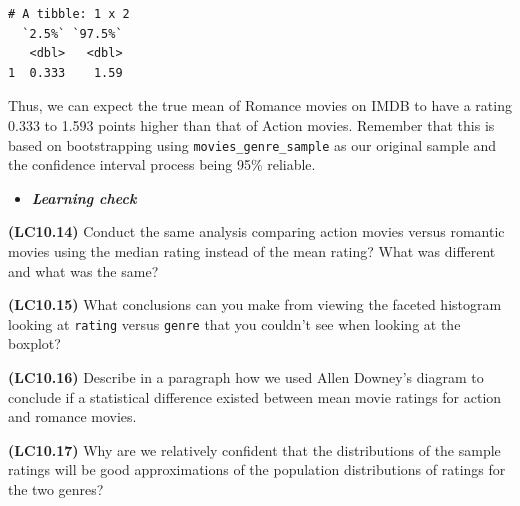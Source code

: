 \documentclass[12pt,]{krantz}
\makeatletter
\newenvironment{Shaded}{\begin{snugshade}}{\end{snugshade}}
\newcommand{\KeywordTok}[1]{\textcolor[rgb]{0.27,0.27,0.27}{\textbf{#1}}}
\newcommand{\DataTypeTok}[1]{\textcolor[rgb]{0.27,0.27,0.27}{#1}}
\newcommand{\DecValTok}[1]{\textcolor[rgb]{0.06,0.06,0.06}{#1}}
\newcommand{\StringTok}[1]{\textcolor[rgb]{0.5,0.5,0.5}{#1}}
\newcommand{\CommentTok}[1]{\textcolor[rgb]{0.37,0.37,0.37}{\textit{#1}}}
\newcommand{\OperatorTok}[1]{\textcolor[rgb]{0.43,0.43,0.43}{\textbf{#1}}}
\newcommand{\NormalTok}[1]{#1}
\newenvironment{kframe}{%
\medskip{}
\setlength{\fboxsep}{.8em}
 \def\at@end@of@kframe{}%
 \ifinner\ifhmode%
  \def\at@end@of@kframe{\end{minipage}}%
  \begin{minipage}{\columnwidth}%
 \fi\fi%
 \def\FrameCommand##1{\hskip\@totalleftmargin \hskip-\fboxsep
 \colorbox{shadecolor}{##1}\hskip-\fboxsep
     \hskip-\linewidth \hskip-\@totalleftmargin \hskip\columnwidth}%
 \MakeFramed {\advance\hsize-\width
   \@totalleftmargin\z@ \linewidth\hsize
   \@setminipage}}%
 {\par\unskip\endMakeFramed%
 \at@end@of@kframe}
\renewenvironment{Shaded}{\begin{kframe}}{\end{kframe}}
\newenvironment{rmdblock}[1]
  {\begin{shaded*}
  \begin{itemize}
  \renewcommand{\labelitemi}{
    \raisebox{-.7\height}[0pt][0pt]{
    }
  }
  \item
  }
  {
  \end{itemize}
  \end{shaded*}
  }
\newenvironment{learncheck}
  {\begin{rmdblock}{warning}}
  {\end{rmdblock}}
\makeatother
\begin{document}
\begin{Shaded}
\end{Shaded}

\begin{verbatim}
# A tibble: 1 x 2
  `2.5%` `97.5%`
   <dbl>   <dbl>
1  0.333    1.59
\end{verbatim}

Thus, we can expect the true mean of Romance movies on IMDB to have a
rating 0.333 to 1.593 points higher than that of Action movies. Remember
that this is based on bootstrapping using \texttt{movies\_genre\_sample}
as our original sample and the confidence interval process being 95\%
reliable.

\begin{learncheck}
\textbf{\emph{Learning check}}
\end{learncheck}

\textbf{(LC10.14)} Conduct the same analysis comparing action movies
versus romantic movies using the median rating instead of the mean
rating? What was different and what was the same?

\textbf{(LC10.15)} What conclusions can you make from viewing the
faceted histogram looking at \texttt{rating} versus \texttt{genre} that
you couldn't see when looking at the boxplot?

\textbf{(LC10.16)} Describe in a paragraph how we used Allen Downey's
diagram to conclude if a statistical difference existed between mean
movie ratings for action and romance movies.

\textbf{(LC10.17)} Why are we relatively confident that the
distributions of the sample ratings will be good approximations of the
population distributions of ratings for the two genres?
\end{document}
